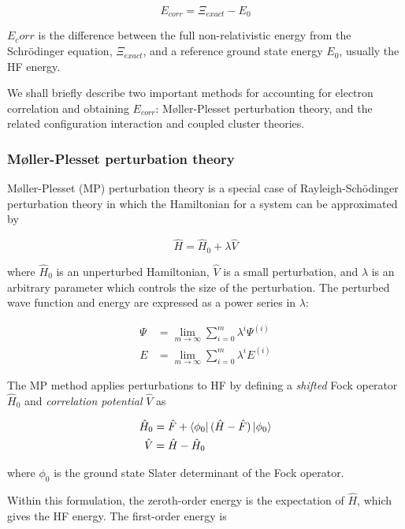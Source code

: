 \begin{equation}
  E_{corr} = \Xi_{exact} - E_0
\end{equation}

\noindent $E_corr$ is the difference between the full non-relativistic energy from the Schr{\"o}dinger equation, $\Xi_{exact}$, and a reference ground state energy $E_0$, usually the HF energy.

We shall briefly describe two important methods for accounting for electron correlation and obtaining $E_{corr}$: M{\o}ller-Plesset perturbation theory, and the related configuration interaction and coupled cluster theories.

\subsubsection{M{\o}ller-Plesset perturbation theory}

M{\o}ller-Plesset (MP) perturbation theory is a special case of Rayleigh-Sch{\"o}dinger perturbation theory in which the Hamiltonian for a system can be approximated by

\begin{equation}
  \hat{H} = \hat{H}_0 + \lambda\hat{V}
\end{equation}

\noindent where $\hat{H}_0$ is an unperturbed Hamiltonian, $\hat{V}$ is a small perturbation, and $\lambda$ is an arbitrary parameter which controls the size of the perturbation. The perturbed wave function and energy are expressed as a power series in $\lambda$:

\begin{align}
 \Psi &= \lim_{m\to\infty} \sum_{i=0}^{m} \lambda^i \Psi^{(i)} \\
  E &= \lim_{m\to\infty} \sum_{i=0}^{m} \lambda^i E^{(i)}
\end{align}

The MP method applies perturbations to HF by defining a \emph{shifted} Fock operator $\hat{H}_0$ and \emph{correlation potential} $\hat{V}$ as

\begin{align}
  \hat{H}_0 &= \hat{F} + \bra{\phi_0}(\hat{H}-\hat{F})\ket{\phi_0} \\
  \hat{V}   &= \hat{H} - \hat{H}_0
\end{align}

\noindent where $\phi_0$ is the ground state Slater determinant of the Fock operator.

Within this formulation, the zeroth-order energy is the expectation of $\hat{H}$, which gives the HF energy. The first-order energy is

